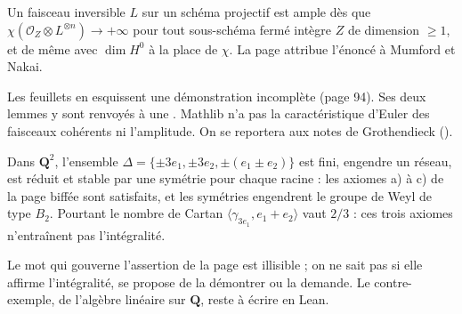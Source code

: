 
\begin{encadre}
\begin{conjecture*}
Un faisceau inversible $L$ sur un schéma projectif est ample dès que $\chi(\mathcal O_Z \otimes L^{\otimes n}) \to +\infty$ pour tout sous-schéma fermé intègre $Z$ de dimension $\geq 1$, et de même avec $\dim H^0$ à la place de $\chi$. La page attribue l'énoncé à Mumford et Nakai.
\end{conjecture*}
\end{encadre}
{\small Les feuillets en esquissent une démonstration incomplète (page 94). Ses deux lemmes y sont renvoyés à une . Mathlib n'a pas la caractéristique d'Euler des faisceaux cohérents ni l'amplitude. On se reportera aux notes de Grothendieck ().\par}

\begin{encadre}
\begin{contrexemple*}\nonverifie
Dans $\mathbf Q^2$, l'ensemble $\Delta = \{\pm 3e_1, \pm 3e_2, \pm(e_1 \pm e_2)\}$ est fini, engendre un réseau, est réduit et stable par une symétrie pour chaque racine : les axiomes a) à c) de la page biffée sont satisfaits, et les symétries engendrent le groupe de Weyl de type $B_2$. Pourtant le nombre de Cartan $\langle \gamma_{3e_1}, e_1 + e_2 \rangle$ vaut $2/3$ : ces trois axiomes n'entraînent pas l'intégralité.
\end{contrexemple*}
\end{encadre}
{\small Le mot qui gouverne l'assertion de la page est illisible ; on ne sait pas si elle affirme l'intégralité, se propose de la démontrer ou la demande. Le contre-exemple, de l'algèbre linéaire sur $\mathbf Q$, reste à écrire en Lean.\par}

